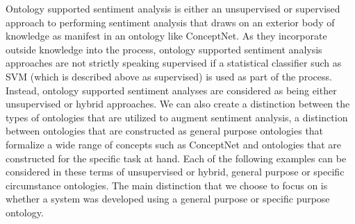 \documentclass[letterpaper, 10 pt, conference]{ieeeconf}
\begin{document}
Ontology supported sentiment analysis is either an unsupervised or supervised approach to performing sentiment analysis that draws on an exterior body of knowledge as manifest in an ontology like ConceptNet. As they incorporate outside knowledge into the process, ontology supported sentiment analysis approaches are not strictly speaking supervised if a statistical classifier such as SVM (which is described above as supervised) is used as part of the process. Instead, ontology supported sentiment analyses are considered as being either unsupervised or hybrid approaches. We can also create a distinction between the types of ontologies that are utilized to augment sentiment analysis, a distinction between ontologies that are constructed as general purpose ontologies that formalize a wide range of concepts such as ConceptNet and ontologies that are constructed for the specific task at hand. Each of the following examples can be considered in these terms of unsupervised or hybrid, general purpose or specific circumstance ontologies. The main distinction that we choose to focus on is whether a system was developed using a general purpose or specific purpose ontology.
\end{document}
